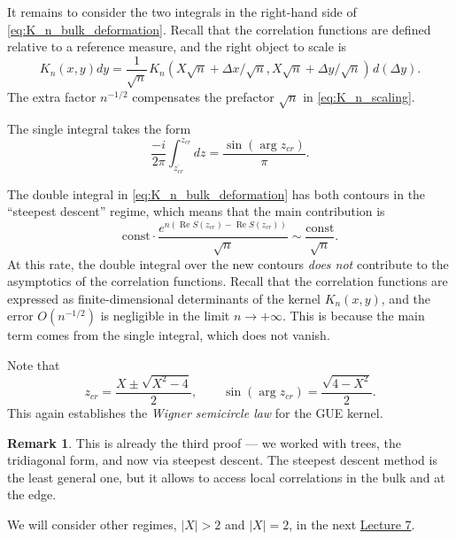 \documentclass[letterpaper,11pt,oneside,reqno]{article}
\numberwithin{equation}{section}
\newcommand{\ssp}{\hspace{1pt}}
\theoremstyle{definition}
\newtheorem{remark}[proposition]{Remark}
\begin{document}
It remains to consider the two integrals in the right-hand side
of \eqref{eq:K_n_bulk_deformation}.
Recall that the correlation functions are
defined relative to a reference measure, and the right object to scale is
\begin{equation*}
	K_n(x,y)dy=\frac{1}{\sqrt n}
	\ssp
	K_n(X\sqrt n+\Delta x/\sqrt n,X\sqrt n+\Delta y/\sqrt n)
	\ssp d\left( \Delta y \right).
\end{equation*}
The extra factor $n^{-1/2}$
compensates the prefactor $\sqrt n$ in
\eqref{eq:K_n_scaling}.

The single integral takes the form
\begin{equation}
	\label{eq:K_n_bulk_single}
	\frac{-i}{2\pi}
	\int_{\overline{z_{cr}}}^{z_{cr}}
	dz
	=\frac{\sin(\arg z_{cr})}{\pi}.
\end{equation}

The double integral
in \eqref{eq:K_n_bulk_deformation}
has both contours
in the ``steepest descent'' regime, which means that
the main contribution is
\begin{equation*}
	\mathrm{const}\cdot
	\frac{e^{n\left( \operatorname{Re}S(z_{cr})-\operatorname{Re}S(z_{cr}) \right)}}{\sqrt n}
	\sim \frac{\mathrm{const}}{\sqrt n}.
\end{equation*}
At this rate, the double integral over the new contours
\emph{does not} contribute to the asymptotics of the correlation functions.
Recall that the correlation functions are expressed as finite-dimensional
determinants of the kernel $K_n(x,y)$, and the error $O(n^{-1/2})$ is
negligible in the limit $n\to+\infty$.
This is because the main term comes from the single integral,
which does not vanish.

Note that
\begin{equation*}
	z_{cr}=\frac{X\pm \sqrt{X^2-4}}{2},
	\qquad
	\sin(\arg z_{cr})=\frac{\sqrt{4-X^2}}{2}.
\end{equation*}
This again establishes the \emph{Wigner semicircle law} for the GUE kernel.

\begin{remark}
	This is already the third proof --- we worked with trees, the tridiagonal form,
	and now via steepest descent. The steepest descent method is the least general one,
	but it allows to access local correlations in the bulk and at the edge.
\end{remark}

We will consider other regimes, $|X|>2$ and $|X|=2$, in the next
\href{https://lpetrov.cc/rmt25/rmt25-notes/rmt2025-l07.pdf}{Lecture 7}.
\end{document}
